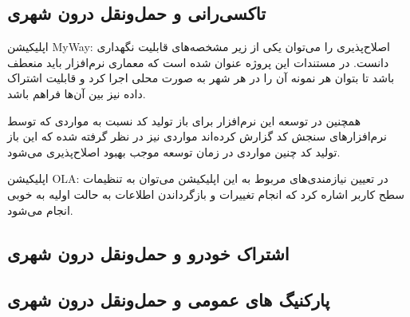 \subsection{تاکسی‌رانی و حمل‌و‌نقل درون شهری}

اپلیکیشن MyWay: اصلاح‌پذیری را می‌توان یکی از زیر مشخصه‌های قابلیت‌‌ نگهداری دانست. در مستندات این پروژه عنوان شده است که معماری نرم‌افزار باید منعطف باشد تا بتوان هر نمونه آن را در هر شهر به صورت محلی اجرا کرد و قابلیت اشتراک داده نیز بین آن‌‌ها فراهم باشد. 

همچنین در توسعه این نرم‌افزار برای باز تولید کد نسبت به مواردی که توسط نرم‌افزارهای سنجش کد گزارش کرده‌اند مواردی نیز در نظر گرفته شده که این باز تولید کد چنین مواردی در زمان توسعه موجب بهبود اصلاح‌پذیری می‌شود.

اپلیکیشن OLA: در تعیین نیازمندی‌های مربوط به این اپلیکیشن می‌توان به تنظیمات سطح کاربر اشاره کرد که انجام تغییرات و بازگرداندن اطلاعات به حالت اولیه به خوبی انجام می‌شود.


\subsection{اشتراک خودرو و حمل‌و‌نقل درون شهری}


\subsection{پارکنیگ های عمومی و حمل‌و‌نقل درون شهری}
